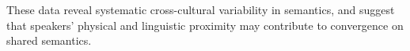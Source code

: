 \documentclass{evolang12}
\begin{document}
\nocite{bakker2009adding}


These data reveal systematic cross-cultural variability in semantics, and suggest that  speakers' physical and linguistic proximity may contribute to convergence on shared semantics.


 
\end{document}
